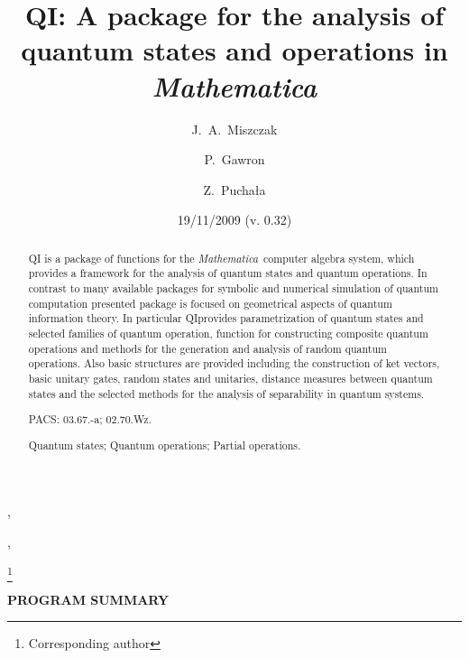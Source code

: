 \documentclass{elsart}
\newcommand{\Mathematica}{\emph{Mathematica}}
\newcommand{\1}{{\rm 1\hspace{-0.9mm}l}}
\newcommand{\qi}{QI}
\begin{document}
\begin{frontmatter}



\title{\qi: A package for the analysis of quantum states and operations in
\Mathematica}

\date{19/11/2009 (v. 0.32)}

\author{J.~A.~Miszczak},
\author{P.~Gawron},
\author{Z.~Pucha{\l}a}

\thanks[author]{Corresponding author}

\address{Institute of Theoretical and Applied Informatics, Polish Academy of 
Sciences, Ba{\l}tycka 5, 44-100 Gliwice, Poland}

\begin{abstract}
QI is a package of functions for the \Mathematica\ computer algebra system,
which provides a framework for the analysis of quantum states and quantum
operations. In contrast to many available packages for symbolic and numerical
simulation of quantum computation presented package is focused on geometrical
aspects of quantum information theory. In particular \qi provides
parametrization of quantum states and selected families of quantum operation,
function for constructing composite quantum operations and methods for the
generation and analysis of random quantum operations. Also basic structures are
provided including the construction of ket vectors, basic unitary gates, random
states and unitaries, distance measures between quantum states and the selected
methods for the analysis of separability in quantum systems.

\begin{flushleft}
PACS: 03.67.-a; 02.70.Wz.
\end{flushleft}

\begin{keyword}
Quantum states; Quantum operations; Partial operations.
\end{keyword}
\end{abstract}

\end{frontmatter}
{\bf PROGRAM SUMMARY}
\end{document}
